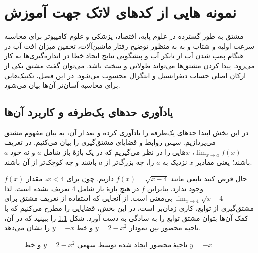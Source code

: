 
\chapter{نمونه هایی  از کدهای لاتک جهت آموزش}\label{chapter1}
\paragraphfootnotes


مشتق‌ به طور گسترده در علوم پایه، اقتصاد، پزشکی و علوم کامپیوتر برای محاسبه سرعت اولیه و شتاب و به
به منظور توضیح رفتار ماشین‌آلات، تخمین میزان افت آب در هنگام پمپ شدن آب از تانکر آب و پیشگویی نتایج ایجاد خطا در اندازه‌گیری‌ها به کار می‌رود. پیدا کردن مشتق‌ها می‌تواند طولانی و سخت باشد. می‌توان گفت مشتق یکی از ارکان اصلی حساب
دیفرانسیل و انتگرال محسوب می‌شود. در این فصل، تکنیک‌هایی
برای محاسبه آسان‌تر آن‌ها بیان می‌شود.%
\cite{george95}
\section{یادآوری حدهای یک‌طرفه و کاربرد آن‌ها}
در این بخش ابتدا حدهای یک‌طرفه را یادآوری کرده و بعد از آن، به بیان مفهوم مشتق می‌پردازیم. سپس روابط و
قضایای مشتق‌گیری را بیان می‌کنیم.
در تعریف 
$\lim_{x\rightarrow a}f(x)$،
$x$هایی
را در نظر می‌گیریم که در یک بازهٔ باز شامل $a$ و نه خود $a$ باشند؛ یعنی مقادیر $x$ نزدیک به $a$ را، 
چه بزرگ‌تر از $a$ باشند و چه کوچک‌تر از آن باشند. 

حال فرض کنید تابعی مانند $f(x)=\sqrt{x-4}$ داریم. چون برای
$x<4$،
مقدار $f(x)$ وجود ندارد، بنابراین $f$ در هیچ بازهٔ باز شامل $4$ تعریف نشده است. لذا 
$\lim_{x\rightarrow 4}\sqrt{x-4}$
بی‌معنی است. از آنجایی که استفاده از تعریف مشتق برای مشتق‌گیری از توابع، کاری زمان‌بر است، در این بخش، قضایایی 
را مطرح می‌کنیم که با کمک آن‌ها بتوان مشتق توابع را به سادگی به دست آورد.  شکل \ref{fig1-1} را ببینید که در آن، ناحیهٔ محصور بین نمودار $y=2-x^2$ و خط $y=-x$ را
نشان می‌دهد.

\begin{figure}[!h]
\centering
{}
\caption{ناحیهٔ محصور ایجاد شده توسط سهمی $y=2-x^2$ و خط $y=-x$}
\label{fig1-1}
\end{figure}

